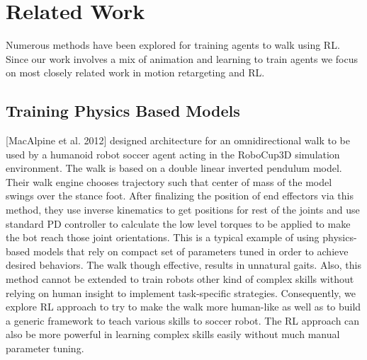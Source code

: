 \chapter{Related Work}

Numerous methods have been explored for training agents to walk using RL. Since our work involves a mix of animation and learning to train agents we focus on most closely related work in motion retargeting and RL.

\section{Training Physics Based Models}
[MacAlpine et al. 2012]\cite{AAAI12-MacAlpine} designed architecture for an omnidirectional walk to be used by a humanoid robot soccer agent acting in the RoboCup3D simulation environment. The walk is based on a double linear inverted pendulum model. Their walk engine chooses trajectory such that center of mass of the model swings over the stance foot. After finalizing the position of end effectors via this method, they use inverse kinematics to get positions for rest of the joints and use standard PD controller to calculate the low level torques to be applied to make the bot reach those joint orientations. This is a typical example of using physics-based models that rely on compact set of parameters tuned in order to achieve desired behaviors. The walk though effective, results in unnatural gaits. Also, this method cannot be extended to train robots other kind of complex skills without relying on human insight to implement task-specific strategies. Consequently, we explore RL approach to try to make the walk more human-like as well as to build a generic framework to teach various skills to soccer robot. The RL approach can also be more powerful in learning complex skills easily without much manual parameter tuning. 

